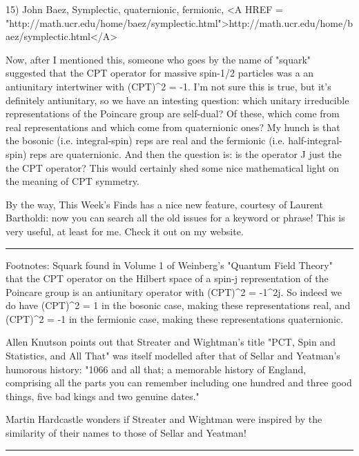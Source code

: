 15) John Baez, Symplectic, quaternionic, fermionic, 
<A HREF = "http://math.ucr.edu/home/baez/symplectic.html">http://math.ucr.edu/home/baez/symplectic.html</A>

Now, after I mentioned this, someone who goes by the name of "squark"
suggested that the CPT operator for massive spin-1/2 particles was a
an antiunitary intertwiner with (CPT)^{2} = -1.  I'm not sure this is
true, but it's definitely antiunitary, so we have an intesting question:
which unitary irreducible representations of the Poincare group are
self-dual?  Of these, which come from real representations and which
come from quaternionic ones?  My hunch is that the bosonic (i.e. 
integral-spin) reps are real and the fermionic (i.e. half-integral-spin) 
reps are quaternionic.  And then the question is: is the operator J
just the the CPT operator?  This would certainly shed some nice mathematical
light on the meaning of CPT symmetry.  

By the way, This Week's Finds has a nice new feature, courtesy of
Laurent Bartholdi: now you can search all the old issues for a keyword
or phrase!  This is very useful, at least for me.  Check it out on 
my website.

\par\noindent\rule{\textwidth}{0.4pt}


Footnotes: 
Squark found in Volume 1 of Weinberg's "Quantum Field
Theory" that the CPT operator on the Hilbert space of a spin-j
representation of the Poincare group is an antiunitary operator
with (CPT)^{2} = -1^{2j}.  So indeed we do have 
(CPT)^{2} = 1 in the bosonic case, making these representations
real, and (CPT)^{2} = -1 in the fermionic case, making these
representations quaternionic.


 Allen Knutson points out that Streater and Wightman's title "PCT,
Spin and Statistics, and All That" was itself modelled after that of
Sellar and Yeatman's humorous history: "1066 and all that; a memorable
history of England, comprising all the parts you can remember including
one hundred and three good things, five bad kings and two genuine dates."

Martin Hardcastle wonders if Streater and Wightman were inspired by the
similarity of their names to those of Sellar and Yeatman!







 \par\noindent\rule{\textwidth}{0.4pt}

